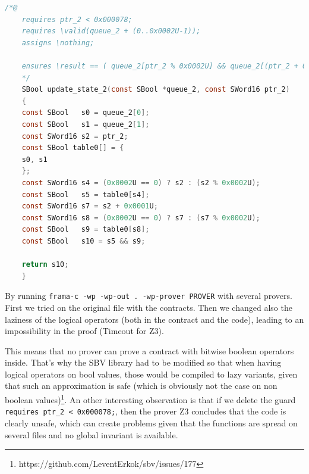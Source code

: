 \documentclass[a4paper,11pt,final]{article}
\begin{document}
	\begin{lstlisting}[language=C, keywordstyle=\color{blue}]
	/*@
	requires ptr_2 < 0x000078;
	requires \valid(queue_2 + (0..0x0002U-1));
	assigns \nothing;
	
	ensures \result == ( queue_2[ptr_2 % 0x0002U] && queue_2[(ptr_2 + 0x0001U) % 0x0002U]);
	*/
	SBool update_state_2(const SBool *queue_2, const SWord16 ptr_2)
	{
	const SBool   s0 = queue_2[0];
	const SBool   s1 = queue_2[1];
	const SWord16 s2 = ptr_2;
	const SBool table0[] = {
	s0, s1
	};
	const SWord16 s4 = (0x0002U == 0) ? s2 : (s2 % 0x0002U);
	const SBool   s5 = table0[s4];
	const SWord16 s7 = s2 + 0x0001U;
	const SWord16 s8 = (0x0002U == 0) ? s7 : (s7 % 0x0002U);
	const SBool   s9 = table0[s8];
	const SBool   s10 = s5 && s9;
	
	return s10;
	}
	\end{lstlisting}
	By running \texttt{frama-c -wp -wp-out . -wp-prover PROVER} with several provers. First we tried on the original file with the contracts. Then we changed also the laziness of the logical operators (both in the contract and the code), leading to an impossibility in the proof (Timeout for Z3). 
	
	This means that no prover can prove a contract with bitwise boolean operators inside. That's why the SBV library had to be modified so that when having logical operators on bool values, those would be compiled to lazy variants, given that such an approximation is safe (which is obviously not the case on non boolean values)\footnote{https://github.com/LeventErkok/sbv/issues/177}. An other interesting observation is that if we delete the guard \texttt{requires ptr\_2 < 0x000078;}, then the prover Z3 concludes that the code is clearly unsafe, which can create problems given that the functions are spread on several files and no global invariant is available. 
	
\end{document}
